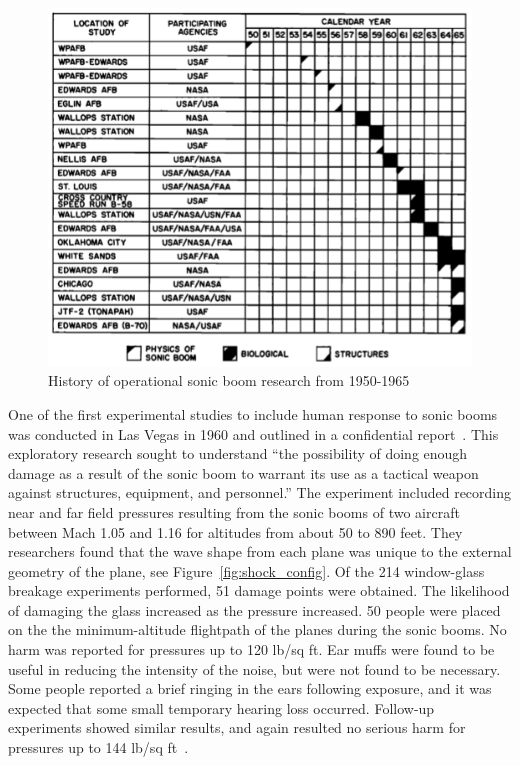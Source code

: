 \documentclass[]{aiaa-tc}%
\begin{document}
\begin{figure}[tb!]
  \centering
  \includegraphics[width=\textwidth]{figs/research-status.png}
  \caption{History of operational sonic boom research from 1950-1965~\cite{nixon1965sonic}}
  \label{fig:research_status}
\end{figure}

One of the first experimental studies to include human response to sonic booms was conducted in Las Vegas in 1960 and outlined in a confidential report~\cite{maglieri1961ground}. This exploratory research sought to understand ``the possibility of doing enough damage as a result of the sonic boom to warrant its use as a tactical weapon against structures, equipment, and personnel.'' The experiment included recording near and far field pressures resulting from the sonic booms of two aircraft between Mach 1.05 and 1.16 for altitudes from about 50 to 890 feet. They researchers found that the wave shape from each plane was unique to the external geometry of the plane, see Figure~\ref{fig:shock_config}. Of the 214 window-glass breakage experiments performed, 51 damage points were obtained. The likelihood of damaging the glass increased as the pressure increased. 50 people were placed on the the minimum-altitude flightpath of the planes during the sonic booms. No harm was reported for pressures up to 120 lb/sq ft. Ear muffs were found to be useful in reducing the intensity of the noise, but were not found to be necessary. Some people reported a brief ringing in the ears following exposure, and it was expected that some small temporary hearing loss occurred. Follow-up experiments showed similar results, and again resulted no serious harm for pressures up to 144 lb/sq ft~\cite{nixon1968sonic}.
\end{document}
